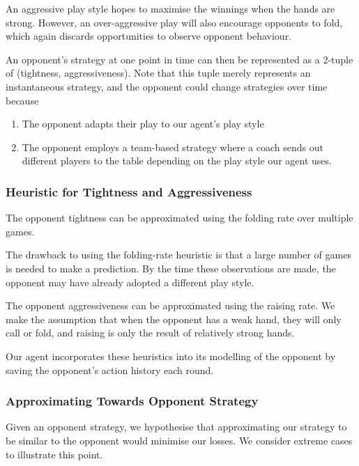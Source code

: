 \documentclass{article}
\begin{document}
An aggressive play style hopes to maximise the winnings when the hands are strong. However, an over-aggressive play will also encourage opponents to fold, which again discards opportunities to observe opponent behaviour.

An opponent's strategy at one point in time can then be represented as a 2-tuple of (tightness, aggressiveness). Note that this tuple merely represents an instantaneous strategy, and the opponent could change strategies over time because

\begin{enumerate}
	\item The opponent adapts their play to our agent's play style
	\item The opponent employs a team-based strategy where a coach sends out different players to the table depending on the play style our agent uses.
\end{enumerate}

\subsubsection{Heuristic for Tightness and Aggressiveness}

The opponent tightness can be approximated using the folding rate over multiple games. 

The drawback to using the folding-rate heuristic is that a large number of games is needed to make a prediction. By the time these observations are made, the opponent may have already adopted a different play style.

The opponent aggressiveness can be approximated using the raising rate. We make the assumption that when the opponent has a weak hand, they will only call or fold, and raising is only the result of relatively strong hands.

Our agent incorporates these heuristics into its modelling of the opponent by saving the opponent's action history each round.

\subsubsection{Approximating Towards Opponent Strategy}

Given an opponent strategy, we hypothesise that approximating our strategy to be similar to the opponent would minimise our losses. We consider extreme cases to illustrate this point. 
\end{document}
